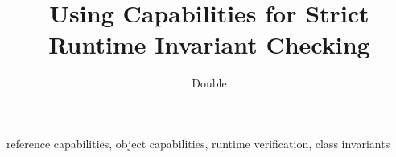 \documentclass[review]{elsarticle}
\begin{document}
\begin{frontmatter}

\title{Using Capabilities for Strict Runtime Invariant Checking}


\author{Double}
\address{Blind}

\begin{abstract}

\end{abstract}

\begin{keyword}
reference capabilities\sep
object capabilities\sep
runtime verification\sep
class invariants
\end{keyword}

\end{frontmatter}
\linenumbers

%
%
%




\end{document}
